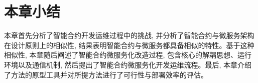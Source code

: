 \section{本章小结}

本章首先分析了智能合约开发运维过程中的挑战, 并分析了智能合约与微服务架构在设计原则上的相似性, 结果表明智能合约与微服务都具备相似的特性。基于这种相似性, 本章随后阐述了智能合约微服务化改造过程, 包含核心的解耦思想、运行环境以及通信机制, 然后提出了智能合约微服务化开发运维流程。最后, 本章介绍了方法的原型工具并对所提方法进行了可行性与部署效率的评估。